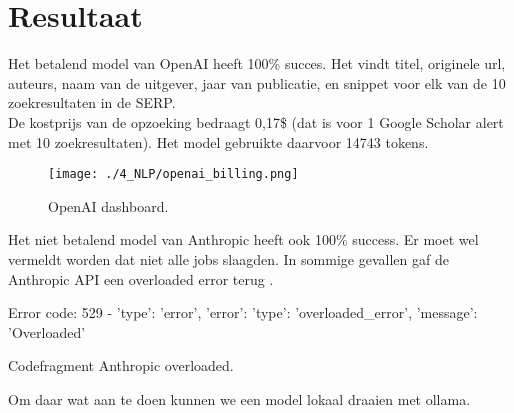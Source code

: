 \section{Resultaat}
Het betalend model van OpenAI heeft 100\% succes. Het vindt titel, originele url, auteurs, naam van de uitgever, jaar van publicatie, en snippet voor elk van de 10 zoekresultaten in de SERP.\\
De kostprijs van de opzoeking bedraagt 0,17\$ (dat is voor 1 Google Scholar alert met 10 zoekresultaten). Het model gebruikte daarvoor 14743 tokens. 
\begin{figure}
    \centering
    \texttt{[image: ./4\_NLP/openai\_billing.png]}
    \caption[OpenAI dashboard.]{\label{fig:OpenAI dashboard}OpenAI dashboard.}
\end{figure}
Het niet betalend model van Anthropic heeft ook 100\% success. Er moet wel vermeldt worden dat niet alle jobs slaagden. In sommige gevallen gaf de Anthropic API een overloaded error terug \autocite{AnthropicOverloaded2025}.
\begin{listing}
    Error code: 529 - {'type': 'error', 'error': {'type': 'overloaded_error', 'message': 'Overloaded'}}
    \caption[Anthropic overloaded codefragment]{Codefragment Anthropic overloaded.}
    \label{code:Anthropic overloaded codefragment}
\end{listing}
Om daar wat aan te doen kunnen we een model lokaal draaien met ollama.

